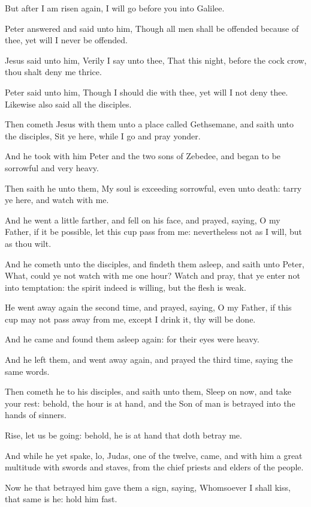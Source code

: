 \Verse But after I am risen again, I will go before you into Galilee.

\Verse Peter answered and said unto him, Though all men shall be offended because of thee, yet will I never be offended.

\Verse Jesus said unto him, Verily I say unto thee, That this night, before the cock crow, thou shalt deny me thrice.

\Verse Peter said unto him, Though I should die with thee, yet will I not deny thee. Likewise also said all the disciples.

\Verse Then cometh Jesus with them unto a place called Gethsemane, and saith unto the disciples, Sit ye here, while I go and pray yonder.

\Verse And he took with him Peter and the two sons of Zebedee, and began to be sorrowful and very heavy.

\Verse Then saith he unto them, My soul is exceeding sorrowful, even unto death: tarry ye here, and watch with me.

\Verse And he went a little farther, and fell on his face, and prayed, saying, O my Father, if it be possible, let this cup pass from me: nevertheless not as I will, but as thou wilt.

\Verse And he cometh unto the disciples, and findeth them asleep, and saith unto Peter, What, could ye not watch with me one hour?  \Verse Watch and pray, that ye enter not into temptation: the spirit indeed is willing, but the flesh is weak.

\Verse He went away again the second time, and prayed, saying, O my Father, if this cup may not pass away from me, except I drink it, thy will be done.

\Verse And he came and found them asleep again: for their eyes were heavy.

\Verse And he left them, and went away again, and prayed the third time, saying the same words.

\Verse Then cometh he to his disciples, and saith unto them, Sleep on now, and take your rest: behold, the hour is at hand, and the Son of man is betrayed into the hands of sinners.

\Verse Rise, let us be going: behold, he is at hand that doth betray me.

\Verse And while he yet spake, lo, Judas, one of the twelve, came, and with him a great multitude with swords and staves, from the chief priests and elders of the people.

\Verse Now he that betrayed him gave them a sign, saying, Whomsoever I shall kiss, that same is he: hold him fast.

